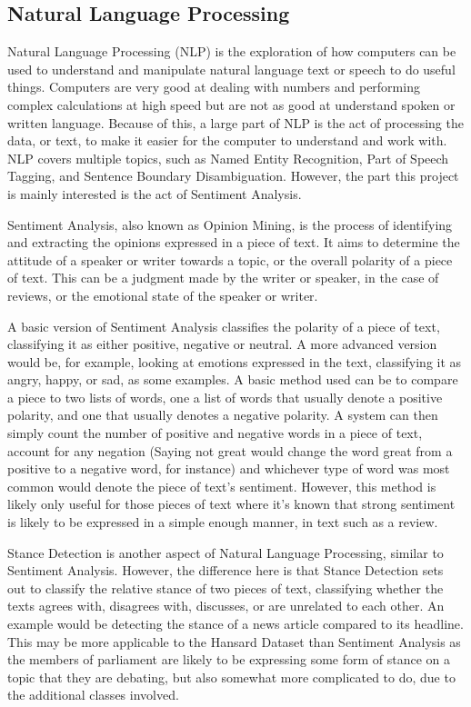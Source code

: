 \subsection{Natural Language Processing}
\label{sec:bck_NLP}
Natural Language Processing (NLP) is the exploration of how computers can be used to understand and manipulate natural language text or speech to do useful things\cite{chowdhury2003natural}. Computers are very good at dealing with numbers and performing complex calculations at high speed but are not as good at understand spoken or written language. Because of this, a large part of NLP is the act of processing the data, or text, to make it easier for the computer to understand and work with. NLP covers multiple topics, such as Named Entity Recognition, Part of Speech Tagging, and Sentence Boundary Disambiguation. However, the part this project is mainly interested is the act of Sentiment Analysis.

Sentiment Analysis, also known as Opinion Mining, is the process of identifying and extracting the opinions expressed in a piece of text\cite{Liu2010}. It aims to determine the attitude of a speaker or writer towards a topic, or the overall polarity of a piece of text. This can be a judgment made by the writer or speaker, in the case of reviews, or the emotional state of the speaker or writer.

A basic version of Sentiment Analysis classifies the polarity of a piece of text, classifying it as either positive, negative or neutral. A more advanced version would be, for example, looking at emotions expressed in the text, classifying it as angry, happy, or sad, as some examples. A basic method used can be to compare a piece to two lists of words, one a list of words that usually denote a positive polarity, and one that usually denotes a negative polarity. A system can then simply count the number of positive and negative words in a piece of text, account for any negation (Saying not great would change the word great from a positive to a negative word, for instance) and whichever type of word was most common would denote the piece of text’s sentiment. However, this method is likely only useful for those pieces of text where it’s known that strong sentiment is likely to be expressed in a simple enough manner, in text such as a review.  

Stance Detection is another aspect of Natural Language Processing, similar to Sentiment Analysis. However, the difference here is that Stance Detection sets out to classify the relative stance of two pieces of text, classifying whether the texts agrees with, disagrees with, discusses, or are unrelated to each other. An example would be detecting the stance of a news article compared to its headline. This may be more applicable to the Hansard Dataset than Sentiment Analysis as the members of parliament are likely to be expressing some form of stance on a topic that they are debating, but also somewhat more complicated to do, due to the additional classes involved.

